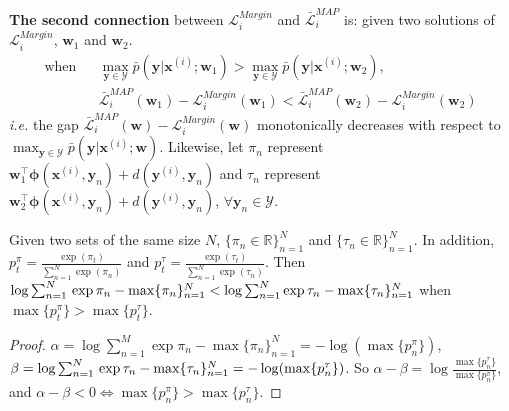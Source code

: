 \textbf{The second connection} between $\mathcal{L}^{Margin}_i$ and $\bar{\mathcal{L}}^{MAP}_i$ is:  
given two solutions of $\mathcal{L}_i^{Margin}$, $\mathbf{w}_1$  and $\mathbf{w}_2$.   
\begin{equation}
    \begin{array}{rcl}
        \text{when} & &\max_{\mathbf{y}\in\mathcal{Y}}\bar{p}(\mathbf{y}|\mathbf{x}^{(i)};\mathbf{w}_1)> \max_{\mathbf{y}\in\mathcal{Y}}\bar{p}(\mathbf{y}|\mathbf{x}^{(i)};\mathbf{w}_2),\\ 
                    & &\bar{\mathcal{L}}_i^{MAP}(\mathbf{w}_1)-\mathcal{L}_i^{Margin}(\mathbf{w}_1) < \bar{\mathcal{L}}_i^{MAP}(\mathbf{w}_2)-\mathcal{L}_i^{Margin}(\mathbf{w}_2) 
    \end{array}
\label{equ:monotomic}
\end{equation}
\emph{i.e.} the gap $\bar{\mathcal{L}}_i^{MAP}(\mathbf{w})-\mathcal{L}_i^{Margin}(\mathbf{w})$ monotonically decreases with respect to $\max_{\mathbf{y}\in\mathcal{Y}}\bar{p}(\mathbf{y}|\mathbf{x}^{(i)};\mathbf{w})$. 
Likewise, let $\pi_n$ represent  
$\mathbf{w}_1^\top \boldsymbol{\phi}(\mathbf{x}^{(i)},\mathbf{y}_n)+d(\mathbf{y}^{(i)},\mathbf{y}_n)$ and $\tau_n$ represent 
$\mathbf{w}_2^\top \boldsymbol{\phi}(\mathbf{x}^{(i)},\mathbf{y}_n)+d(\mathbf{y}^{(i)},\mathbf{y}_n)$, $\forall \mathbf{y}_n\in\mathcal{Y}$. 
\begin{proposition}
    Given two sets of the same size $N$, $\{\pi_n\in\mathbb{R}\}_{n=1}^N$ and $\{\tau_n\in\mathbb{R}\}_{n=1}^N$. In addition, $p_t^\pi=\frac{\exp(\pi_t)}{\sum_{n=1}^N\exp(\pi_n)}$ 
    and $p_t^\tau=\frac{\exp(\tau_t)}{\sum_{n=1}^N\exp(\tau_n)}$. Then $\log\sum_{n=1}^N\\ \exp{\pi_n}-\max\{\pi_n\}_{n=1}^N< \log\sum_{n=1}^N \exp{\tau_n}-\max\{\tau_n\}_{n=1}^N$ when 
    $\max\{ p_t^\pi\}>\max\{ p_t^\tau\}$.   
\label{pro:monotomic}
\end{proposition}
\begin{proof}
    $\alpha=\log \sum_{n=1}^M \exp{\pi_n}-\max\{\pi_n\}_{n=1}^N=-\log (\max\{p^\pi_n\})$, $\beta=\log \sum_{n=1}^N\\\exp{\tau_n}-\max\{\tau_n\}_{n=1}^N=-\log (\max\{p^\tau_n\})$. So $\alpha-\beta=
    \log \frac{\max \{p^\tau_n\}}{\max \{p^\pi_n\}}$, and $\alpha-\beta<0 \Leftrightarrow \max \{p^\pi_n\}>\max \{p^\tau_n\}$.     
\end{proof}


